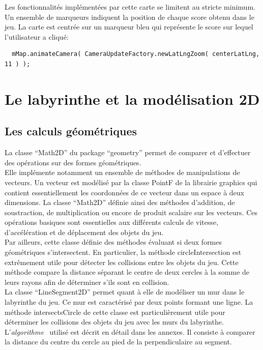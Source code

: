 \documentclass{article}
\begin{document}
Les fonctionnalités implémentées par cette carte se limitent au stricte minimum.
Un ensemble de marqueurs indiquent la position de chaque score obtenu dans le jeu.
La carte est centrée sur un marqueur bleu qui représente le score sur lequel l'utilisateur a cliqué:
\begin{verbatim}
  mMap.animateCamera( CameraUpdateFactory.newLatLngZoom( centerLatLng, 11 ) );
\end{verbatim}

\section{Le labyrinthe et la modélisation 2D}
\subsection{Les calculs géométriques}
La classe \enquote{Math2D} du package \enquote{geometry} permet de comparer et d'effectuer des opérations sur des formes géométriques.\\

Elle implémente notamment un ensemble de méthodes de manipulations de vecteurs.
Un vecteur est modélisé par la classe PointF de la librairie graphics qui contient essentiellement les coordonnées de ce vecteur dans un espace à deux dimensions.
La classe \enquote{Math2D} définie ainsi des méthodes d'addition, de soustraction, de multiplication ou encore de produit scalaire sur les vecteurs.
Ces opérations basiques sont essentielles aux différents calculs de vitesse, d'accélération et de déplacement des objets du jeu.\\

Par ailleurs, cette classe définie des méthodes évaluant si deux formes géométriques s'intersectent.
En particulier, la méthode circleIntersection est extrêmement utile pour détecter les collisions entre les objets du jeu.
Cette méthode compare la distance séparant le centre de deux cercles à la somme de leurs rayons afin de déterminer s'ils sont en collision.\\

La classe \enquote{LineSegment2D} permet quant à elle de modéliser un mur dans le labyrinthe du jeu.
Ce mur est caractérisé par deux points formant une ligne.
La méthode intersectsCircle de cette classe est particulièrement utile pour déterminer les collisions des objets du jeu avec les murs du labyrinthe.
L'\textit{algorithme}~\cite{wallCollisionDoc} utilisé est décrit en détail dans les annexes.
Il consiste à comparer la distance du centre du cercle au pied de la perpendiculaire au segment.
\end{document}

